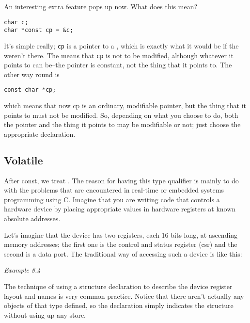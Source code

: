    An interesting extra feature pops up now. What does this mean?


\begin{Verbatim}
char c;
char *const cp = &c;
\end{Verbatim}

   It's simple really; \texttt{cp} is a pointer to
    a \kchar, which is exactly what it would be if the
    \const{} weren't there. The \const{} means that
    \texttt{cp} is not to be modified, although whatever it points to
    can be--the pointer is constant, not the thing that it points to.
    The other way round is


\begin{Verbatim}
const char *cp;
\end{Verbatim}

   which means that now cp is an ordinary, modifiable pointer, but the
    thing that it points to must not be modified. So, depending on what you
    choose to do, both the pointer and the thing it points to may be
    modifiable or not; just choose the appropriate declaration.


  

  \subsection{Volatile}
   

   After const, we treat \volatile. The reason for having
    this type qualifier is mainly to do with the problems that are
    encountered in real-time or embedded systems programming using C.
    Imagine that you are writing code that controls a hardware device by
    placing appropriate values in hardware registers at known absolute
    addresses.


   Let's imagine that the device has two registers, each 16 bits long, at
    ascending memory addresses; the first one is the control and status
    register (csr) and the second is a data port. The traditional way of
    accessing such a device is like this:


    \begin{center}\textit{Example 8.4}\end{center}


   The technique of using a structure declaration to describe the device
    register layout and names is very common practice. Notice that there
    aren't actually any objects of that type defined, so the declaration
    simply indicates the structure without using up any store.



